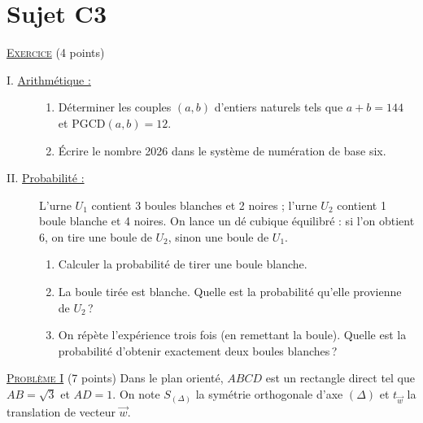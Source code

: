 \section{Sujet C3}
\noindent \underline{\textsc{Exercice}} (4 points)
\begin{description}
\item[I. \underline{Arithm\'etique :}]
      \begin{enumerate}
      \item D\'eterminer les couples $(a , b)$ d'entiers naturels tels que $a + b = 144$ et $\mathrm{PGCD}(a , b) = 12$.
      \item \'Ecrire le nombre 2026 dans le syst\`eme de num\'eration de base six.
      \end{enumerate}
\item[II. \underline{Probabilit\'e :}]
      L'urne $U_1$ contient 3 boules blanches et 2 noires ; l'urne $U_2$ contient 1 boule blanche et 4 noires.
      On lance un d\'e cubique \'equilibr\'e : si l'on obtient 6, on tire une boule de $U_2$, sinon une boule de $U_1$.
      \begin{enumerate}
      \item Calculer la probabilit\'e de tirer une boule blanche.
      \item La boule tir\'ee est blanche. Quelle est la probabilit\'e qu'elle provienne de $U_2$\,?
      \item On r\'ep\`ete l'exp\'erience trois fois (en remettant la boule). Quelle est la probabilit\'e d'obtenir
            exactement deux boules blanches\,?
      \end{enumerate}
\end{description}

\noindent \underline{\textsc{Probl\`eme I}} (7 points) \newline
Dans le plan orient\'e, $ABCD$ est un rectangle direct tel que $AB = \sqrt{3}$ et $AD = 1$.
On note $S_{(\Delta)}$ la sym\'etrie orthogonale d'axe $(\Delta)$ et $t_{\vec{w}}$ la translation de vecteur $\vec{w}$.

